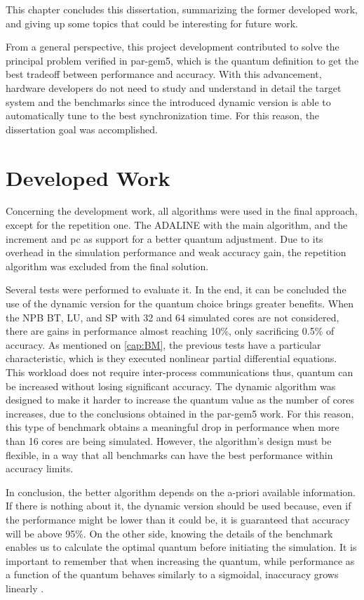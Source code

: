 

This chapter concludes this dissertation, summarizing the former developed work, and giving up some topics that could be
interesting for future work.

From a general perspective, this project development contributed to solve the principal problem verified in par-gem5, which is the 
quantum definition to get the best tradeoff between performance and accuracy. With this advancement, hardware developers do not 
need to study and understand in detail the target system and the benchmarks since the introduced dynamic version is able to 
automatically tune to the best synchronization time. For this reason, the dissertation goal was accomplished. 

\section{Developed Work}

Concerning the development work, all algorithms were used in the final approach, except for the repetition one. The ADALINE with 
the main algorithm, and the increment and \gls{pc} as support for a better quantum adjustment. Due to its overhead in the 
simulation performance and weak accuracy gain, the repetition algorithm was excluded from the final solution.


Several tests were performed to evaluate it. In the end, it can be concluded the use of the dynamic version for the quantum choice brings 
greater benefits. When the NPB BT, LU, and SP with 32 and 64 simulated cores are not considered, there are gains in performance almost 
reaching 10\%, only sacrificing 0.5\% of accuracy. As mentioned on \autoref{cap:BM}, the previous tests have a particular characteristic, 
which is they executed nonlinear partial differential equations. This workload does not require inter-process communications thus, 
quantum can be increased without losing significant accuracy. The dynamic algorithm was designed to make it harder to increase the 
quantum value as the number of cores increases, due to the conclusions obtained in the par-gem5 \cite*{pargem5} work. For this reason, 
this type of benchmark obtains a meaningful drop in performance when more than 16 cores are being simulated. However, the 
algorithm's design must be flexible, in a way that all benchmarks can have the best performance within accuracy limits. 

In conclusion, the better algorithm depends on the a-priori available information. If there is nothing about it, the dynamic version should be 
used because, even if the performance might be lower than it could be, it is guaranteed that accuracy will be above 95\%. On the other side,
knowing the details of the benchmark enables us to calculate the optimal quantum before initiating the simulation. It is important to 
remember that when increasing the quantum, while performance as a function of the quantum behaves similarly to a sigmoidal, inaccuracy 
grows linearly \cite*{BeyondQuantumTDSim}.

